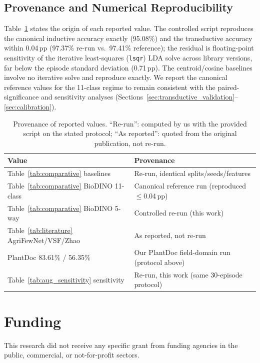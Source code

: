 \documentclass[preprint,12pt]{elsarticle}
\begin{document}
\subsection{Provenance and Numerical Reproducibility}
Table~\ref{tab:provenance} states the origin of each reported value. The controlled script reproduces the canonical inductive accuracy exactly (95.08\%) and the transductive accuracy within 0.04\,pp (97.37\% re-run vs.\ 97.41\% reference); the residual is floating-point sensitivity of the iterative least-squares (\texttt{lsqr}) LDA solve across library versions, far below the episode standard deviation (0.71\,pp). The centroid/cosine baselines involve no iterative solve and reproduce exactly. We report the canonical reference values for the 11-class regime to remain consistent with the paired-significance and sensitivity analyses (Sections~\ref{sec:transductive_validation}--\ref{sec:calibration}).

\begin{table}[htbp]
\centering
\caption{Provenance of reported values. ``Re-run'': computed by us with the provided script on the stated protocol; ``As reported'': quoted from the original publication, not re-run.}
\label{tab:provenance}
\footnotesize
\begin{tabularx}{\columnwidth}{l X}
\toprule
\textbf{Value} & \textbf{Provenance} \\
\midrule
Table~\ref{tab:comparative} baselines & Re-run, identical splits/seeds/features \\
Table~\ref{tab:comparative} BioDINO 11-class & Canonical reference run (reproduced $\le$0.04\,pp) \\
Table~\ref{tab:comparative} BioDINO 5-way & Controlled re-run (this work) \\
Table~\ref{tab:literature} AgriFewNet/VSF/Zhao & As reported, not re-run \\
PlantDoc 83.61\% / 56.35\% & Our PlantDoc field-domain run (protocol above) \\
Table~\ref{tab:aug_sensitivity} sensitivity & Re-run, this work (same 30-episode protocol) \\
\bottomrule
\end{tabularx}
\end{table}

\section*{Funding}
This research did not receive any specific grant from funding agencies in the public, commercial, or not-for-profit sectors.
\end{document}
